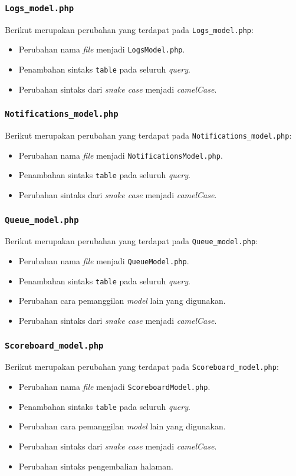 \subsubsection{\texttt{Logs\_model.php}}
Berikut merupakan perubahan yang terdapat pada \texttt{Logs\_model.php}:
\begin{itemize}
	\item Perubahan nama \textit{file} menjadi \texttt{LogsModel.php}.
	\item Penambahan sintaks \texttt{table} pada seluruh \textit{query}.
	\item Perubahan sintaks dari \textit{snake case} menjadi \textit{camelCase}.
\end{itemize}
\subsubsection{\texttt{Notifications\_model.php}}
Berikut merupakan perubahan yang terdapat pada \texttt{Notifications\_model.php}:
\begin{itemize}
	\item Perubahan nama \textit{file} menjadi \texttt{NotificationsModel.php}.
	\item Penambahan sintaks \texttt{table} pada seluruh \textit{query}.
	\item Perubahan sintaks dari \textit{snake case} menjadi \textit{camelCase}.
\end{itemize}
\subsubsection{\texttt{Queue\_model.php}}
Berikut merupakan perubahan yang terdapat pada \texttt{Queue\_model.php}:
\begin{itemize}
	\item Perubahan nama \textit{file} menjadi \texttt{QueueModel.php}.
	\item Penambahan sintaks \texttt{table} pada seluruh \textit{query}.
	\item Perubahan cara pemanggilan \textit{model} lain yang digunakan.
	\item Perubahan sintaks dari \textit{snake case} menjadi \textit{camelCase}.
\end{itemize}
\subsubsection{\texttt{Scoreboard\_model.php}}
Berikut merupakan perubahan yang terdapat pada \texttt{Scoreboard\_model.php}:
\begin{itemize}
	\item Perubahan nama \textit{file} menjadi \texttt{ScoreboardModel.php}.
	\item Penambahan sintaks \texttt{table} pada seluruh \textit{query}.
	\item Perubahan cara pemanggilan \textit{model} lain yang digunakan.
	\item Perubahan sintaks dari \textit{snake case} menjadi \textit{camelCase}.
	\item Perubahan sintaks pengembalian halaman.
\end{itemize}
